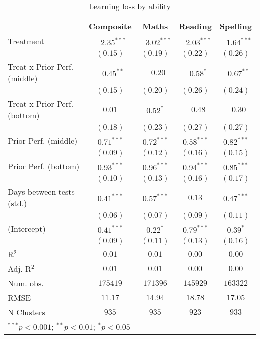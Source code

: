 
\begin{table}
\begin{center}
\begin{tabular}{l c c c c}
\hline
 & Composite & Maths & Reading & Spelling \\
\hline
Treatment                    & $-2.35^{***}$ & $-3.02^{***}$ & $-2.03^{***}$ & $-1.64^{***}$ \\
                             & $(0.15)$      & $(0.19)$      & $(0.22)$      & $(0.26)$      \\
Treat x Prior Perf. (middle) & $-0.45^{**}$  & $-0.20$       & $-0.58^{*}$   & $-0.67^{**}$  \\
                             & $(0.15)$      & $(0.20)$      & $(0.26)$      & $(0.24)$      \\
Treat x Prior Perf. (bottom) & $0.01$        & $0.52^{*}$    & $-0.48$       & $-0.30$       \\
                             & $(0.18)$      & $(0.23)$      & $(0.27)$      & $(0.27)$      \\
Prior Perf. (middle)         & $0.71^{***}$  & $0.72^{***}$  & $0.58^{***}$  & $0.82^{***}$  \\
                             & $(0.09)$      & $(0.12)$      & $(0.16)$      & $(0.15)$      \\
Prior Perf. (bottom)         & $0.93^{***}$  & $0.96^{***}$  & $0.94^{***}$  & $0.85^{***}$  \\
                             & $(0.10)$      & $(0.13)$      & $(0.16)$      & $(0.17)$      \\
Days between tests (std.)    & $0.41^{***}$  & $0.57^{***}$  & $0.13$        & $0.47^{***}$  \\
                             & $(0.06)$      & $(0.07)$      & $(0.09)$      & $(0.11)$      \\
(Intercept)                  & $0.41^{***}$  & $0.22^{*}$    & $0.79^{***}$  & $0.39^{*}$    \\
                             & $(0.09)$      & $(0.11)$      & $(0.13)$      & $(0.16)$      \\
\hline
R$^2$                        & $0.01$        & $0.01$        & $0.00$        & $0.00$        \\
Adj. R$^2$                   & $0.01$        & $0.01$        & $0.00$        & $0.00$        \\
Num. obs.                    & $175419$      & $171396$      & $145929$      & $163322$      \\
RMSE                         & $11.17$       & $14.94$       & $18.78$       & $17.05$       \\
N Clusters                   & $935$         & $935$         & $923$         & $933$         \\
\hline
\multicolumn{5}{l}{\scriptsize{$^{***}p<0.001$; $^{**}p<0.01$; $^{*}p<0.05$}}
\end{tabular}
\caption{Learning loss by ability}
\label{tableability}
\end{center}
\end{table}
